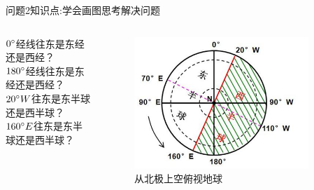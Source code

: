 \documentclass[10pt]{ctexbeamer}
\begin{document}
    \begin{frame}{问题2}{知识点:学会画图思考解决问题}
        \begin{columns}
            \begin{block}{}
                $0\degree$经线往东是东经还是西经？\\
                $180\degree$经线往东是东经还是西经？\\
                $20\degree W$往东是东半球还是西半球？\\
                $160\degree E$往东是东半球还是西半球？\\
            \end{block}
            \begin{figure}
                \pause
                \includegraphics[width=0.89\textwidth]{assets/line 2.jpg}
                \caption{从北极上空俯视地球}
            \end{figure}
            
        \end{columns}
    \end{frame}
\end{document}
